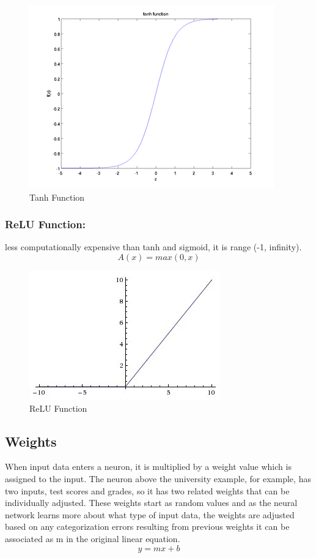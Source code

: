 \documentclass[12pt]{report}
\begin{document}
    \begin{figure} [h]
        \centering
        \includegraphics[width=.5\textwidth]{./images/tanh.png}
        \caption{Tanh Function}
        \label{fig:tanh}
    \end{figure}

    \subsubsection{ReLU Function:}
    less computationally expensive than tanh and sigmoid, it is range (-1, infinity).
    $$ A(x) = max(0,x) $$

    \begin{figure} [h]
        \centering
        \includegraphics[width=.5\textwidth]{./images/relu.jpeg}
        \caption{ReLU Function}
        \label{fig:relu}
    \end{figure}

\subsection{Weights}
When input data enters a neuron, it is multiplied by a weight value which is assigned to the input. The neuron above the university example, 
for example, has two inputs, test scores and grades, so it has two related weights that can be individually adjusted.
These weights start as random values and as the neural network learns more about what type of input data, 
the weights are adjusted based on any categorization errors resulting from previous weights it can be associated as m in the original linear equation.
$$ y = mx + b$$
\end{document}
